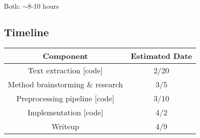 \documentclass[conference]{sig-alternate-05-2015}
\begin{document}
Both: $\sim$8-10 hours

\subsection{Timeline}

\begin{center}
  \begin{tabular}{|c|c|} \hline

    \textbf{Component}                & \textbf{Estimated Date}    \\ \hline
    Text extraction [code]            & 2/20                       \\ \hline
    Method brainstorming \& research  & 3/5                        \\ \hline
    Preprocessing pipeline [code]     & 3/10                       \\ \hline
    Implementation [code]             & 4/2                        \\ \hline
    Writeup                           & 4/9                        \\ \hline

  \end{tabular}
\end{center}



\end{document}
